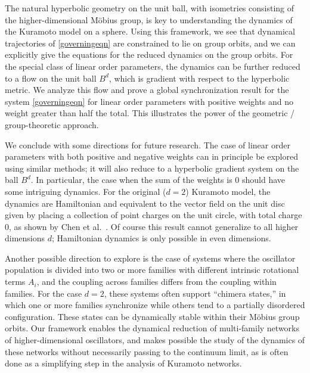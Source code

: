\documentclass[%
 aip,
 amsmath,amssymb,
 reprint,%
]{revtex4-1}
\begin{document}
The natural hyperbolic geometry on the unit ball, with isometries consisting of the higher-dimensional M\"obius group, is key to understanding the dynamics of the Kuramoto model on a sphere.  Using this framework, we see that dynamical trajectories of \eqref{governingeqn} are constrained to lie on group orbits, and we can explicitly give the equations for the reduced dynamics on the group orbits.  For the special class of linear order parameters, the dynamics can be further reduced to a flow on the unit ball $B^d$, which is gradient with respect to the hyperbolic metric.  We analyze this flow and prove a global synchronization result for the system \eqref{governingeqn} for linear order parameters with positive weights and no weight greater than half the total.  This illustrates the power of the geometric / group-theoretic approach.

We conclude with some directions for future research.  The case of linear order parameters with both positive and negative weights can in principle be explored using similar methods; it will also reduce to a hyperbolic gradient system on the ball $B^d$.  In particular, the case when the sum of the weights is $0$ should have some intriguing dynamics. For the original ($d=2$) Kuramoto model, the dynamics are Hamiltonian and equivalent to the vector field on the unit disc given by placing a collection of point charges on the unit circle, with total charge $0$, as shown by Chen et al.~\cite{chen2019dynamics}.  Of course this result cannot generalize to all higher dimensions $d$; Hamiltonian dynamics is only possible in even dimensions.  

Another possible direction to explore is the case of systems where the oscillator population is divided into two or more families with different intrinsic rotational terms $A_i$, and the coupling across families differs from the coupling within families.  For the case $d = 2$, these systems often support ``chimera states,'' in which one or more  families synchronize while others tend to a partially disordered configuration.  These states can be dynamically stable within their M\"obius group orbits.  Our framework enables the dynamical reduction of multi-family networks of higher-dimensional oscillators, and makes possible the study of the dynamics of these networks without necessarily passing to the continuum limit, as is often done as a simplifying step in the analysis of Kuramoto networks.
\end{document}
